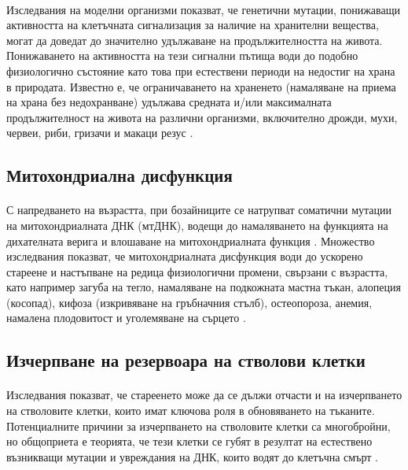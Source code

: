 \documentclass[pdftex,cyrillic,14pt,a4page,twoside,openright]{extreport}
\begin{document}
\paragraph{}
Изследвания на моделни организми показват, че генетични мутации, понижаващи активността на клетъчната сигнализация за наличие на хранителни вещества, могат да доведат до значително удължаване на продължителността на живота. Понижаването на активността на тези сигнални пътища води до подобно физиологично състояние като това при естествени периоди на недостиг на храна в природата. Известно е, че ограничаването на храненето (намаляване на приема на храна без недохранване) удължава средната и/или максималната продължителност на живота на различни организми, включително дрожди, мухи, червеи, риби, гризачи и макаци резус \cite{fontana2010}.

\subsection{Митохондриална дисфункция}
\paragraph{}
С напредването на възрастта, при бозайниците се натрупват соматични мутации на митохондриалната ДНК (мтДНК), водещи до намаляването на функцията на дихателната верига и влошаване на митохондриалната функция \cite{trifunovic2008}. Множество изследвания \cite{kujoth2005, vermulst2008} показват, че митохондриалната дисфункция води до ускорено стареене и настъпване на редица физиологични промени, свързани с възрастта, като например загуба на тегло, намаляване на подкожната мастна тъкан, алопеция (косопад), кифоза (изкривяване на гръбначния стълб), остеопороза, анемия, намалена плодовитост и уголемяване на сърцето \cite{trifunovic2008}.

\subsection{Изчерпване на резервоара на стволови клетки}
\paragraph{}
Изследвания показват, че стареенето може да се дължи отчасти и на изчерпването на стволовите клетки, които имат ключова роля в обновяването на тъканите. Потенциалните причини за изчерпването на стволовите клетки са многобройни, но общоприета е теорията, че тези клетки се губят в резултат на естествено възникващи мутации и увреждания на ДНК, които водят до клетъчна смърт \cite{ruzankina2007, revuelta2017}.
\end{document}
